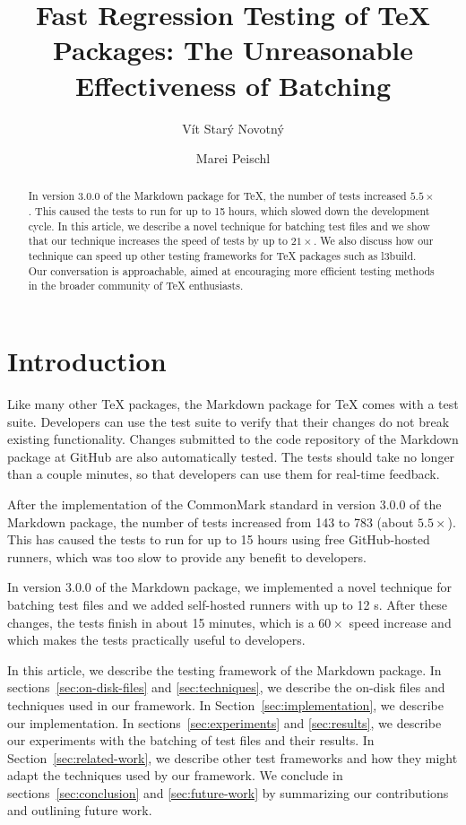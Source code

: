 \documentclass[final]{ltugboat}
\title{Fast Regression Testing of \TeX{} Packages: The Unreasonable Effectiveness of Batching}
\author{Vít Starý Novotný}
\author{Marei Peischl}
\begin{document}
\maketitle

\begin{abstract}
In version 3.0.0 of the Markdown package for \TeX, the number of tests increased $5.5\times$. This caused the tests to run for up to 15 hours, which slowed down the development cycle. In this article, we describe a novel technique for batching test files and we show that our technique increases the speed of tests by up to $21\times$. We also discuss how our technique can speed up other testing frameworks for \TeX{} packages such as l3build. Our conversation is approachable, aimed at encouraging more efficient testing methods in the broader community of \TeX{} enthusiasts.
\end{abstract}

\section{Introduction}
Like many other \TeX{} packages, the Markdown package for \TeX{} comes with a test suite. Developers can use the test suite to verify that their changes do not break existing functionality. Changes submitted to the code repository of the Markdown package at GitHub are also automatically tested. The tests should take no longer than a couple minutes, so that developers can use them for real-time feedback.

After the implementation of the CommonMark standard in version 3.0.0 of the Markdown package, the number of tests increased from 143 to 783 (about $5.5\times$). This has caused the tests to run for up to 15 hours using free GitHub-hosted runners, which was too slow to provide any benefit to developers.

In version 3.0.0 of the Markdown package, we implemented a novel technique for batching test files and we added self-hosted runners with up to 12 s. After these changes, the tests finish in about 15 minutes, which is a $60\times$ speed increase and which makes the tests practically useful to developers.

In this article, we describe the testing framework of the Markdown package. In sections~\ref{sec:on-disk-files} and \ref{sec:techniques}, we describe the on-disk files and techniques used in our framework. In Section~\ref{sec:implementation}, we describe our implementation. In sections~\ref{sec:experiments} and \ref{sec:results}, we describe our experiments with the batching of test files and their results. In Section~\ref{sec:related-work}, we describe other test frameworks and how they might adapt the techniques used by our framework. We conclude in sections~\ref{sec:conclusion} and \ref{sec:future-work} by summarizing our contributions and outlining future work.
\end{document}
